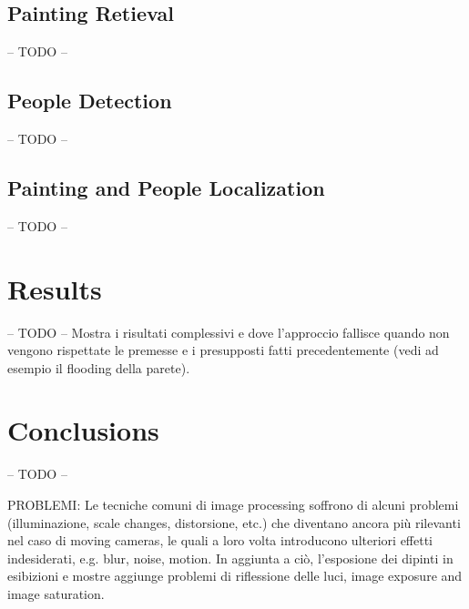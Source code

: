 \documentclass[10pt,twocolumn,letterpaper]{article}
\begin{document}
\subsection{Painting Retieval}
-- TODO --
\subsection{People Detection}
-- TODO --
\subsection{Painting and People Localization}
-- TODO --

\section{Results}
-- TODO --
Mostra i risultati complessivi e dove l'approccio fallisce quando non vengono rispettate le premesse e i presupposti fatti precedentemente (vedi ad esempio il flooding della parete).

\section{Conclusions}
-- TODO --

PROBLEMI:
Le tecniche comuni di image processing soffrono di alcuni problemi (illuminazione, scale changes, distorsione, etc.) che diventano ancora più rilevanti nel caso di moving cameras, le quali a loro volta introducono ulteriori effetti indesiderati, e.g. blur, noise, motion. 
In aggiunta a ciò, l'esposione dei dipinti in esibizioni e mostre aggiunge problemi di riflessione delle luci, image exposure and image saturation.

{\small


}
\end{document}
